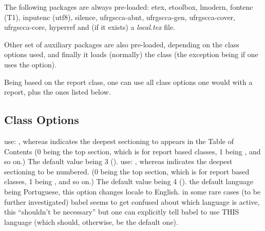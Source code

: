 \documentclass[dctools,english,tocdepth=3,secdepth=3]{ufrgscca} %
\begin{document}
The following packages are always pre-loaded: {\MetaFmt[Pack]\sffamily etex, etoolbox, lmodern, fontenc (T1), inputenc (utf8), silence, ufrgscca-abnt, ufrgscca-gen, ufrgscca-cover, ufrgscca-core, hyperref} and (if it exists) a \emph{local.tex} file.

Other set of auxiliary packages are also pre-loaded, depending on the class options used, and finally it loads (normally) the  class (the exception being if one uses the  option).

Being based on the report class, one can use all class options one would with a report, plus the ones listed below.
\subsection{Class Options}
\begin{Options}
	 use: , whereas  indicates the deepest sectioning to appears in the Table of Contents (0 being the top section, which is \Macro{\chapter}{} for report based classes, 1 being \Macro{\section}{}, and so on.) The default value being 3 (\Macro{\subsubsection}{}).
	 use: , whereas  indicates the deepest sectioning to be numbered. (0 being the top section, which is \Macro{\chapter}{} for report based classes, 1 being \Macro{\section}{}, and so on.) The default value being 4 (\Macro{\paragraph}{}).
	 the default language being Portuguese, this option changes locale to English.
	 in some rare cases (to be further investigated) babel seems to get confused about which language is active, this “shouldn't be necessary” but one can explicitly tell babel to use THIS language (which should, otherwise, be the default one).

\end{Options}
\end{document}

